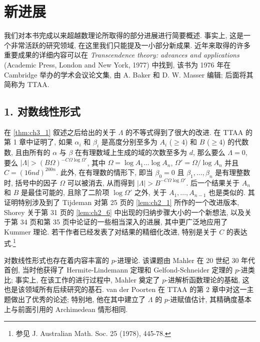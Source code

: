 \chapter*{新进展}

我们对本书完成以来超越数理论所取得的部分进展进行简要概述. 事实上, 这是一个非常活跃的研究领域, 在这里我们只能提及一小部分新成果. 近年来取得的许多重要成果的详细内容可以在 \textit{Transcendence theory: advances and applications} (Academic Press, London and New York, 1977) 中找到, 该书为 1976 年在 Cambridge 举办的学术会议论文集, 由 A. Baker 和 D. W. Masser 编辑; 后面将其简称为 TTAA.

\section*{1. 对数线性形式}

在 \autoref{thm:ch3_1} 叙述之后给出的关于 \(\Lambda\) 的不等式得到了很大的改进. 在 TTAA 的第 1 章中证明了, 如果 \(\alpha_i\) 和 \(\beta_i\) 是高度分别至多为 \(A_i\) (\(\ge 4\)) 和 \(B\) (\(\ge 4\)) 的代数数, 且由所有的 \(\alpha\) 与 \(\beta\) 在有理数域上生成的域的次数至多为 \(d\), 那么要么 \(\Lambda = 0\), 要么 \(|\Lambda| > (B\Omega)^{-C\Omega \log \Omega'}\), 其中 \(\Omega = \log A_1 \dots \log A_n\), \(\Omega' = \Omega/\log A_n\) 并且 \(C = (16nd)^{200n}\). 此外, 在有理数的情形下, 即当 \(\beta_0 = 0\) 且 \(\beta_1, \dots, \beta_n\) 是有理整数时, 括号中的因子 \(\Omega\) 可以被消去, 从而得到 \(|\Lambda| > B^{-C\Omega \log \Omega'}\). 后一个结果关于 \(A_n\) 和 \(B\) 是最佳可能的, 且除了二阶项 \(\log \Omega'\) 之外, 关于 \(A_1, \dots, A_{n-1}\) 也是类似的. 其证明特别涉及到了 Tijdeman 对第 25 页的 \autoref{lem:ch2_1} 所作的一个改进版本, Shorey 关于第 31 页的 \autoref{lem:ch2_6} 中出现的归纳步骤大小的一个新想法, 以及关于第 34 页和第 35 页中论证的一些相当深入的进展, 其中更广泛地应用了 Kummer 理论. 若干作者已经发表了对结果的精细化改进, 特别是关于 \(C\) 的表达式.\footnote{参见 J. Australian Math. Soc. 25 (1978), 445-78.}

对数线性形式也存在着内容丰富的 \(p\)-进理论. 该课题由 Mahler 在 20 世纪 30 年代首创, 当时他获得了 Hermite-Lindemann 定理和 Gelfond-Schneider 定理的 \(p\)-进类比; 事实上, 在该工作的进行过程中, Mahler 奠定了 \(p\)-进解析函数理论的基础, 这也是该领域所有后续研究的基石. van der Poorten 在 TTAA 的第 2 章中对这一主题做出了优秀的论述; 特别地, 他在其中建立了 \(\Lambda\) 的 \(p\)-进赋值估计, 其精确度基本上与前面引用的 Archimedean 情形相同.

